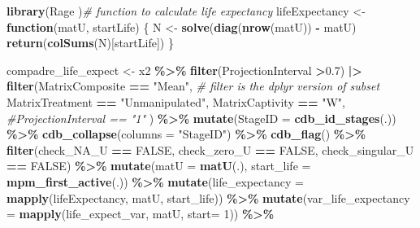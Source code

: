 \documentclass[
]{book}
\newenvironment{Shaded}{\begin{snugshade}}{\end{snugshade}}
\newcommand{\AttributeTok}[1]{\textcolor[rgb]{0.13,0.29,0.53}{#1}}
\newcommand{\CommentTok}[1]{\textcolor[rgb]{0.56,0.35,0.01}{\textit{#1}}}
\newcommand{\ConstantTok}[1]{\textcolor[rgb]{0.56,0.35,0.01}{#1}}
\newcommand{\ControlFlowTok}[1]{\textcolor[rgb]{0.13,0.29,0.53}{\textbf{#1}}}
\newcommand{\DecValTok}[1]{\textcolor[rgb]{0.00,0.00,0.81}{#1}}
\newcommand{\FloatTok}[1]{\textcolor[rgb]{0.00,0.00,0.81}{#1}}
\newcommand{\FunctionTok}[1]{\textcolor[rgb]{0.13,0.29,0.53}{\textbf{#1}}}
\newcommand{\NormalTok}[1]{#1}
\newcommand{\OtherTok}[1]{\textcolor[rgb]{0.56,0.35,0.01}{#1}}
\newcommand{\SpecialCharTok}[1]{\textcolor[rgb]{0.81,0.36,0.00}{\textbf{#1}}}
\newcommand{\StringTok}[1]{\textcolor[rgb]{0.31,0.60,0.02}{#1}}
\theoremstyle{definition}
\theoremstyle{definition}
\theoremstyle{definition}
\theoremstyle{definition}
\theoremstyle{remark}
\begin{document}
\begin{Shaded}
\begin{Highlighting}[]
\FunctionTok{library}\NormalTok{(Rage}
\NormalTok{)}\CommentTok{\# function to calculate life expectancy}
\NormalTok{lifeExpectancy }\OtherTok{\textless{}{-}} \ControlFlowTok{function}\NormalTok{(matU, startLife) \{}
\NormalTok{  N }\OtherTok{\textless{}{-}} \FunctionTok{solve}\NormalTok{(}\FunctionTok{diag}\NormalTok{(}\FunctionTok{nrow}\NormalTok{(matU)) }\SpecialCharTok{{-}}\NormalTok{ matU)}
  \FunctionTok{return}\NormalTok{(}\FunctionTok{colSums}\NormalTok{(N)[startLife])}
\NormalTok{\}}

\NormalTok{compadre\_life\_expect }\OtherTok{\textless{}{-}}\NormalTok{ x2 }\SpecialCharTok{\%\textgreater{}\%} 
  \FunctionTok{filter}\NormalTok{(ProjectionInterval }\SpecialCharTok{\textgreater{}}\FloatTok{0.7}\NormalTok{) }\SpecialCharTok{|\textgreater{}} 
  \FunctionTok{filter}\NormalTok{(MatrixComposite }\SpecialCharTok{==} \StringTok{"Mean"}\NormalTok{, }\CommentTok{\# filter is the dplyr version of subset}
\NormalTok{         MatrixTreatment }\SpecialCharTok{==} \StringTok{"Unmanipulated"}\NormalTok{,}
\NormalTok{         MatrixCaptivity }\SpecialCharTok{==} \StringTok{"W"}\NormalTok{,}
         \CommentTok{\#ProjectionInterval == "1"}
\NormalTok{         ) }\SpecialCharTok{\%\textgreater{}\%} 
  \FunctionTok{mutate}\NormalTok{(}\AttributeTok{StageID =} \FunctionTok{cdb\_id\_stages}\NormalTok{(.)) }\SpecialCharTok{\%\textgreater{}\%}
  \FunctionTok{cdb\_collapse}\NormalTok{(}\AttributeTok{columns =} \StringTok{"StageID"}\NormalTok{) }\SpecialCharTok{\%\textgreater{}\%}
  \FunctionTok{cdb\_flag}\NormalTok{() }\SpecialCharTok{\%\textgreater{}\%} 
  \FunctionTok{filter}\NormalTok{(check\_NA\_U }\SpecialCharTok{==} \ConstantTok{FALSE}\NormalTok{,}
\NormalTok{         check\_zero\_U }\SpecialCharTok{==} \ConstantTok{FALSE}\NormalTok{,}
\NormalTok{         check\_singular\_U }\SpecialCharTok{==} \ConstantTok{FALSE}\NormalTok{) }\SpecialCharTok{\%\textgreater{}\%} 
  \FunctionTok{mutate}\NormalTok{(}\AttributeTok{matU =} \FunctionTok{matU}\NormalTok{(.), }\AttributeTok{start\_life =} \FunctionTok{mpm\_first\_active}\NormalTok{(.)) }\SpecialCharTok{\%\textgreater{}\%} 
  \FunctionTok{mutate}\NormalTok{(}\AttributeTok{life\_expectancy =} \FunctionTok{mapply}\NormalTok{(lifeExpectancy, matU, start\_life)) }\SpecialCharTok{\%\textgreater{}\%} 
  \FunctionTok{mutate}\NormalTok{(}\AttributeTok{var\_life\_expectancy =} \FunctionTok{mapply}\NormalTok{(life\_expect\_var, matU, }\AttributeTok{start=} \DecValTok{1}\NormalTok{)) }\SpecialCharTok{\%\textgreater{}\%}

\end{Highlighting}
\end{Shaded}
\end{document}
